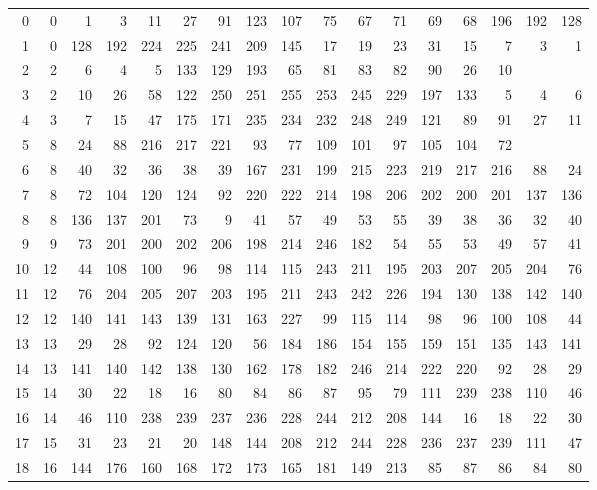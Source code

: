 \documentclass[11pt]{article}
\theoremstyle{remark}
\begin{document}
\begin{center}\footnotesize\setlength{\tabcolsep}{3.2pt}
\begin{tabular}{r|rrrrrrrrrrrrrrrr}
0 & 0 & 1 & 3 & 11 & 27 & 91 & 123 & 107 & 75 & 67 & 71 & 69 & 68 & 196 & 192 & 128 \\
1 & 0 & 128 & 192 & 224 & 225 & 241 & 209 & 145 & 17 & 19 & 23 & 31 & 15 & 7 & 3 & 1 \\
2 & 2 & 6 & 4 & 5 & 133 & 129 & 193 & 65 & 81 & 83 & 82 & 90 & 26 & 10 &  &  \\
3 & 2 & 10 & 26 & 58 & 122 & 250 & 251 & 255 & 253 & 245 & 229 & 197 & 133 & 5 & 4 & 6 \\
4 & 3 & 7 & 15 & 47 & 175 & 171 & 235 & 234 & 232 & 248 & 249 & 121 & 89 & 91 & 27 & 11 \\
5 & 8 & 24 & 88 & 216 & 217 & 221 & 93 & 77 & 109 & 101 & 97 & 105 & 104 & 72 &  &  \\
6 & 8 & 40 & 32 & 36 & 38 & 39 & 167 & 231 & 199 & 215 & 223 & 219 & 217 & 216 & 88 & 24 \\
7 & 8 & 72 & 104 & 120 & 124 & 92 & 220 & 222 & 214 & 198 & 206 & 202 & 200 & 201 & 137 & 136 \\
8 & 8 & 136 & 137 & 201 & 73 & 9 & 41 & 57 & 49 & 53 & 55 & 39 & 38 & 36 & 32 & 40 \\
9 & 9 & 73 & 201 & 200 & 202 & 206 & 198 & 214 & 246 & 182 & 54 & 55 & 53 & 49 & 57 & 41 \\
10 & 12 & 44 & 108 & 100 & 96 & 98 & 114 & 115 & 243 & 211 & 195 & 203 & 207 & 205 & 204 & 76 \\
11 & 12 & 76 & 204 & 205 & 207 & 203 & 195 & 211 & 243 & 242 & 226 & 194 & 130 & 138 & 142 & 140 \\
12 & 12 & 140 & 141 & 143 & 139 & 131 & 163 & 227 & 99 & 115 & 114 & 98 & 96 & 100 & 108 & 44 \\
13 & 13 & 29 & 28 & 92 & 124 & 120 & 56 & 184 & 186 & 154 & 155 & 159 & 151 & 135 & 143 & 141 \\
14 & 13 & 141 & 140 & 142 & 138 & 130 & 162 & 178 & 182 & 246 & 214 & 222 & 220 & 92 & 28 & 29 \\
15 & 14 & 30 & 22 & 18 & 16 & 80 & 84 & 86 & 87 & 95 & 79 & 111 & 239 & 238 & 110 & 46 \\
16 & 14 & 46 & 110 & 238 & 239 & 237 & 236 & 228 & 244 & 212 & 208 & 144 & 16 & 18 & 22 & 30 \\
17 & 15 & 31 & 23 & 21 & 20 & 148 & 144 & 208 & 212 & 244 & 228 & 236 & 237 & 239 & 111 & 47 \\
18 & 16 & 144 & 176 & 160 & 168 & 172 & 173 & 165 & 181 & 149 & 213 & 85 & 87 & 86 & 84 & 80 \\

\end{tabular}
\end{center}
\end{document}

